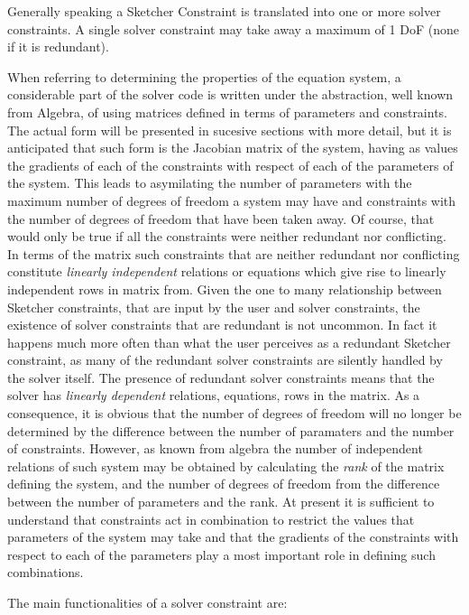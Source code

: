 \documentclass[12pt,twoside,a4paper]{book}
\begin{document}
    Generally speaking a Sketcher Constraint is translated into one or more solver constraints. A single solver constraint may take away a maximum of 1 DoF (none if it is redundant).

    When referring to determining the properties of the equation system, a considerable part of the solver code is written under the abstraction, well known from Algebra, of using matrices defined in terms of parameters and constraints. The actual form will be presented in sucesive sections with more detail, but it is anticipated that such form is the Jacobian matrix of the system, having as values the gradients of each of the constraints with respect of each of the parameters of the system. This leads to asymilating the number of parameters with the maximum number of degrees of freedom a system may have and constraints with the number of degrees of freedom that have been taken away. Of course, that would only be true if all the constraints were neither redundant nor conflicting. In terms of the matrix such constraints that are neither redundant nor conflicting constitute \emph{linearly independent} relations or equations which give rise to linearly independent rows in matrix from. Given the one to many relationship between Sketcher constraints, that are input by the user and solver constraints, the existence of solver constraints that are redundant is not uncommon. In fact it happens much more often than what the user perceives as a redundant Sketcher constraint, as many of the redundant solver constraints are silently handled by the solver itself. The presence of redundant solver constraints means that the solver has \emph{linearly dependent} relations, equations, rows in the matrix. As a consequence, it is obvious that the number of degrees of freedom will no longer be determined by the difference between the number of paramaters and the number of constraints. However, as known from algebra the number of independent relations of such system may be obtained by calculating the \emph{rank} of the matrix defining the system, and the number of degrees of freedom from the difference between the number of parameters and the rank. At present it is sufficient to understand that constraints act in combination to restrict the values that parameters of the system may take and that the gradients of the constraints with respect to each of the parameters play a most important role in defining such combinations.

    The main functionalities of a solver constraint are:
\end{document}
